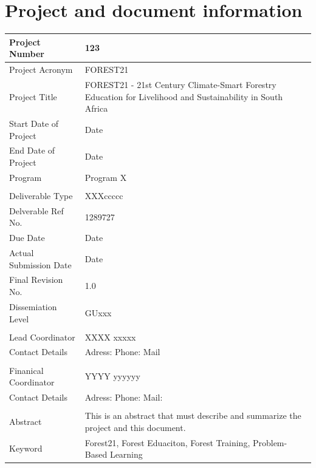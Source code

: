 \documentclass[
  11pt,
]{article}
\begin{document}
\clearpage


\hypertarget{project-and-document-information}{%
\section*{Project and document
information}\label{project-and-document-information}}

\begingroup\fontsize{11}{13}\selectfont

\begin{tabu} to 
\hline
Project Number & 123\\
\hline
Project Acronym & FOREST21\\
\hline
Project Title & FOREST21 - 21st Century Climate-Smart Forestry Education for Livelihood and Sustainability in South                                  Africa\\
\hline
Start Date of Project & Date\\
\hline
End Date of Project & Date\\
\hline
Program & Program X\\
\hline
 & \\
\hline
Deliverable Type & XXXccccc\\
\hline
Delverable Ref No. & 1289727\\
\hline
Due Date & Date\\
\hline
Actual Submission Date & Date\\
\hline
Final Revision No. & 1.0\\
\hline
Dissemiation Level & GUxxx\\
\hline
 & \\
\hline
Lead Coordinator & XXXX xxxxx\\
\hline
Contact Details & Adress: 
 Phone: 
 Mail\\
\hline
 & \\
\hline
Finanical Coordinator & YYYY yyyyyy\\
\hline
Contact Details & Adress: 
 Phone: 
 Mail:\\
\hline
 & \\
\hline
Abstract & This is an abstract that must describe and summarize the project and this document.\\
\hline
Keyword & Forest21, Forest Eduaciton, Forest Training, Problem-Based Learning\\
\hline
\end{tabu}
\endgroup{}
\end{document}
